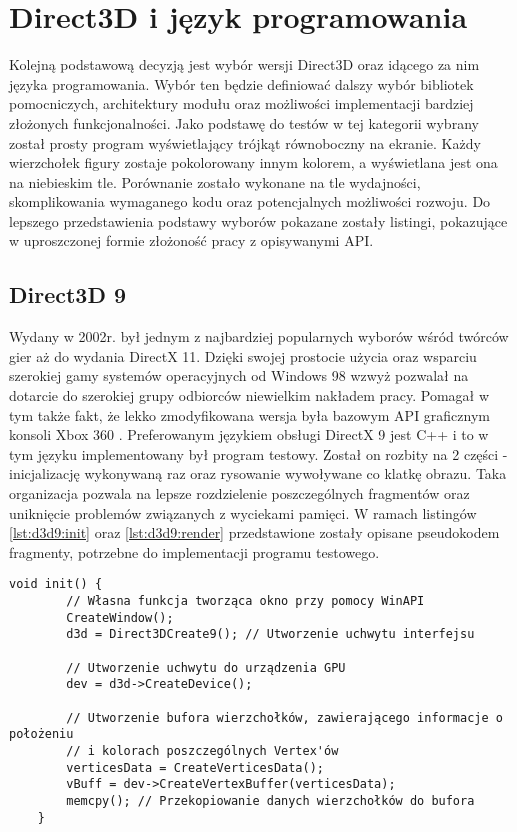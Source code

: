 \section{Direct3D i język programowania}

Kolejną podstawową decyzją jest wybór wersji Direct3D oraz idącego za
nim języka programowania. Wybór ten będzie definiować dalszy wybór
bibliotek pomocniczych, architektury modułu oraz możliwości
implementacji bardziej złożonych funkcjonalności. Jako podstawę do testów w tej kategorii wybrany został prosty program
wyświetlający trójkąt równoboczny na ekranie. Każdy wierzchołek figury
zostaje pokolorowany innym kolorem, a wyświetlana jest ona na niebieskim
tle. Porównanie zostało wykonane na tle wydajności, skomplikowania
wymaganego kodu oraz potencjalnych możliwości rozwoju. Do lepszego przedstawienia podstawy wyborów pokazane zostały listingi, pokazujące w uproszczonej formie złożoność pracy z opisywanymi API.

\subsection{Direct3D 9}

Wydany w 2002r. był jednym z najbardziej popularnych wyborów wśród
twórców gier aż do wydania DirectX 11. Dzięki swojej prostocie użycia
oraz wsparciu szerokiej gamy systemów operacyjnych od Windows 98 wzwyż
\cite{falconfly:dxredist:2024} pozwalał na dotarcie do szerokiej grupy odbiorców niewielkim
nakładem pracy. Pomagał w tym także fakt, że lekko zmodyfikowana wersja była bazowym API
graficznym konsoli Xbox 360 \cite{ms:xbox360bp:2024}. Preferowanym językiem obsługi DirectX 9 jest C++ i to w tym języku
implementowany był program testowy. Został on rozbity na 2 części - inicjalizację wykonywaną
raz oraz rysowanie wywoływane co klatkę obrazu. Taka organizacja pozwala
na lepsze rozdzielenie poszczególnych fragmentów oraz uniknięcie
problemów związanych z wyciekami pamięci. W ramach listingów \ref{lst:d3d9:init} oraz \ref{lst:d3d9:render} przedstawione zostały opisane pseudokodem fragmenty, potrzebne do implementacji programu testowego.

\begin{lstlisting}[caption={Pseudokod inicjalizacji Direct3D 9}, label={lst:d3d9:init}]
	void init() {
		// Własna funkcja tworząca okno przy pomocy WinAPI
		CreateWindow();
		d3d = Direct3DCreate9(); // Utworzenie uchwytu interfejsu
		
		// Utworzenie uchwytu do urządzenia GPU
		dev = d3d->CreateDevice();
		
		// Utworzenie bufora wierzchołków, zawierającego informacje o położeniu 
		// i kolorach poszczególnych Vertex'ów
		verticesData = CreateVerticesData();
		vBuff = dev->CreateVertexBuffer(verticesData);
		memcpy(); // Przekopiowanie danych wierzchołków do bufora
	}
\end{lstlisting}

